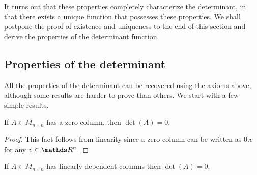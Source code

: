It turns out that these properties completely characterize the determinant,
in that there exists a unique function that possesses these properties.
We shall postpone the proof of existence and uniqueness to the end
of this section and derive the properties of the determinant function.

\subsection{Properties of the determinant}

All the properties of the determinant can be recovered using the axioms
above, although some results are harder to prove than others. We start
with a few simple results.
\begin{prop}
\label{prop:IzeroColumnDetZero}If $A\in M_{n\times n}$ has a zero
column, then $\det\left(A\right)=0$.
\end{prop}

\begin{proof}
This fact follows from linearity since a zero column can be written
as $0.v$ for any $v\in\R^{n}$.
\end{proof}
\begin{prop}
\label{prop:linearlyDependentColumnsDetZero}If $A\in M_{n\times n}$
has linearly dependent columns then $\det\left(A\right)=0$.
\end{prop}


